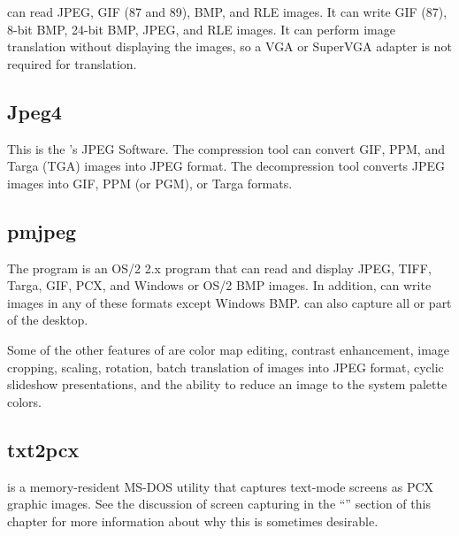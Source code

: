    can read JPEG, 
  GIF (87 and 89), 
  BMP, 
  and RLE images.  It
  can write GIF (87), 8-bit BMP, 24-bit BMP, JPEG, and RLE images.
  It can perform image translation without displaying the images,
  so a VGA or SuperVGA adapter is not required for translation.

\subsection{Jpeg4}
  
  This is the 's 
  JPEG Software.  The compression
  tool can convert GIF, 
  PPM, and 
  Targa (TGA)  images into 
  JPEG format.  The
  decompression tool converts JPEG images into GIF, PPM 
  (or PGM),
  or Targa formats.

\subsection{pmjpeg}

  The  program is an OS/2 2.x program that can read
  and display JPEG, 
  TIFF, 
  Targa, 
  GIF, 
  PCX, 
  and Windows or 
  OS/2 BMP images.
  In addition,  can write images in any of these formats
  except Windows BMP.   can also capture all or part
  of the desktop.
  
  Some of the other features of  are color map editing,
  contrast enhancement, image cropping, scaling, rotation, batch
  translation of images into JPEG format, cyclic slideshow presentations,
  and the ability to reduce an image to the system palette colors.

\subsection{txt2pcx}

   is a memory-resident MS-DOS utility that captures
  text-mode screens as PCX graphic images.  See the discussion of
  screen capturing in the ``'' section of
  this chapter for more information about why this is sometimes desirable.

